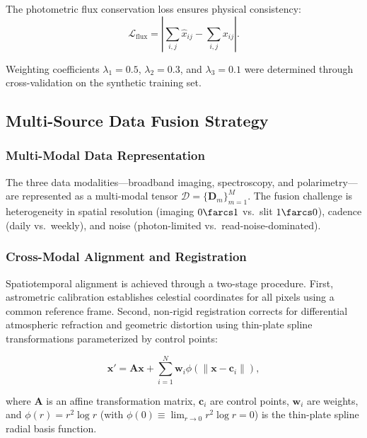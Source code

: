 \documentclass[preprint2]{aastex631}
\begin{document}
The photometric flux conservation loss ensures physical consistency:
\begin{equation}\label{eq:flux_loss}
\mathcal{L}_{\text{flux}} = \left| \sum_{i,j} \hat{x}_{ij} - \sum_{i,j} x_{ij} \right|.
\end{equation}

Weighting coefficients $\lambda_1 = 0.5$, $\lambda_2 = 0.3$, and $\lambda_3 = 0.1$ were determined through cross-validation on the synthetic training set.

\subsection{Multi-Source Data Fusion Strategy}

\subsubsection{Multi-Modal Data Representation}

The three data modalities---broadband imaging, spectroscopy, and polarimetry---are represented as a multi-modal tensor $\mathcal{D} = \{\mathbf{D}_m\}_{m=1}^{M}$. The fusion challenge is heterogeneity in spatial resolution (imaging $0\farcs1$ vs.\ slit $1\farcs0$), cadence (daily vs.\ weekly), and noise (photon-limited vs.\ read-noise-dominated).

\subsubsection{Cross-Modal Alignment and Registration}

Spatiotemporal alignment is achieved through a two-stage procedure. First, astrometric calibration establishes celestial coordinates for all pixels using a common reference frame. Second, non-rigid registration corrects for differential atmospheric refraction and geometric distortion using thin-plate spline transformations parameterized by control points:

\begin{equation}\label{eq:tps}
\mathbf{x}' = \mathbf{A}\mathbf{x} + \sum_{i=1}^{N} \mathbf{w}_i \phi(\|\mathbf{x} - \mathbf{c}_i\|),
\end{equation}

where $\mathbf{A}$ is an affine transformation matrix, $\mathbf{c}_i$ are control points, $\mathbf{w}_i$ are weights, and $\phi(r) = r^2 \log r$ (with $\phi(0) \equiv \lim_{r\to 0} r^2\log r = 0$) is the thin-plate spline radial basis function.
\end{document}
